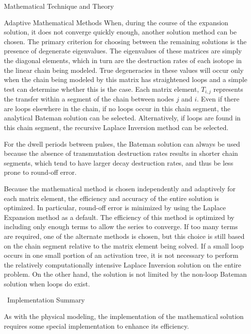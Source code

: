\begin{chapter}{Mathematical Technique and Theory}
\begin{section}{Adaptive Mathematical Methods\label{sec:math.adaptive}}
  When, during the course of the expansion solution, it does not
  converge quickly enough, another solution method can be chosen.  The
  primary criterion for choosing between the remaining solutions is
  the presence of degenerate eigenvalues.  The eigenvalues of these
  matrices are simply the diagonal elements, which in turn are the
  destruction rates of each isotope in the linear chain being
  modeled.  True degeneracies in these values will occur only when
  the chain being modeled by this matrix has straightened loops and a
  simple test can determine whether this is the case.  Each matrix
  element, $T_{i,j}$ represents the transfer within a segment of the
  chain between nodes $j$ and $i$.  Even if there are loops elsewhere
  in the chain, if no loops occur in this chain segment, the
  analytical Bateman solution can be selected.  Alternatively, if
  loops are found in this chain segment, the recursive Laplace
  Inversion method can be selected.
  
  For the dwell periods between pulses, the Bateman solution can
  always be used because the absence of transmutation destruction
  rates results in shorter chain segments, which tend to have larger
  decay destruction rates, and thus be less prone to round-off error.
  
  Because the mathematical method is chosen independently and
  adaptively for each matrix element, the efficiency and accuracy of
  the entire solution is optimized.  In particular, round-off error is
  minimized by using the Laplace Expansion method as a default.  The
  efficiency of this method is optimized by including only enough
  terms to allow the series to converge.  If too many terms are
  required, one of the alternate methods is chosen, but this choice is
  still based on the chain segment relative to the matrix element
  being solved.  If a small loop occurs in one small portion of an
  activation tree, it is not necessary to perform the relatively
  computationally intensive Laplace Inversion solution on the entire
  problem.  On the other hand, the solution is not limited by the
  non-loop Bateman solution when loops do exist.

\end{section}

\begin{section}{\ALARA\ Implementation Summary}\label{sec:math.implement}
  
  As with the physical modeling, the implementation of the
  mathematical solution requires some special implementation to
  enhance its efficiency.
  

\end{section}
\end{chapter}
